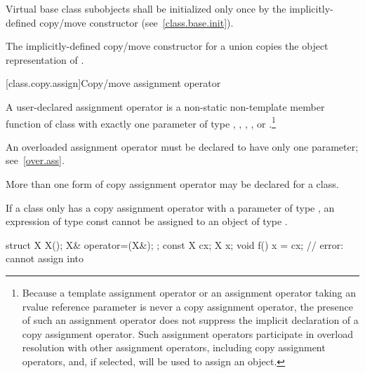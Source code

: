%
Virtual base class subobjects shall be initialized only once by
the implicitly-defined copy/move constructor (see~\ref{class.base.init}).

\pnum
The implicitly-defined copy/move constructor for a union
 copies the object representation of .%
%

[class.copy.assign]{Copy/move assignment operator}%

\pnum
{}%
%
%
%
%
%
%
A user-declared  assignment operator  is a
non-static non-template member function of class  with exactly one
parameter of type , , ,
, or .\footnote{Because
a template assignment operator or an assignment operator
taking an rvalue reference parameter is never a copy assignment operator,
the presence of such an assignment operator does not suppress the
implicit declaration of a copy assignment operator. Such assignment operators
participate in overload resolution with other assignment operators, including
copy assignment operators, and, if selected, will be used to assign an object.}
\begin{note}
An overloaded assignment operator must be declared to have only one parameter;
see~\ref{over.ass}.
\end{note}
\begin{note}
More than one form of copy assignment operator may be declared for a class.
\end{note}
\begin{note}
If a class
only has a copy assignment operator with a parameter of type
,
an expression of type const
cannot be assigned to an object of type
.
\begin{example}
\begin{codeblock}
struct X {
  X();
  X& operator=(X&);
};
const X cx;
X x;
void f() {
  x = cx;           // error:  cannot assign  into 
}
\end{codeblock}
\end{example}
\end{note}

